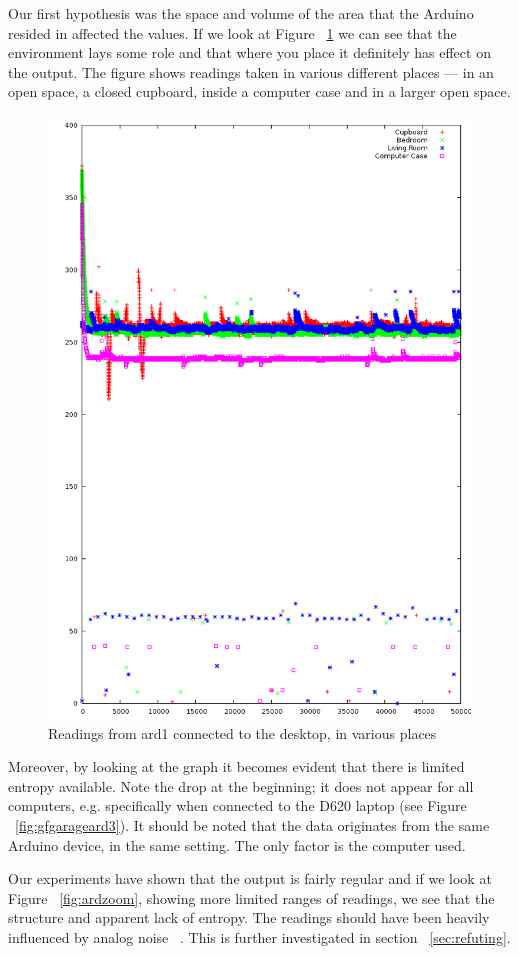 \documentclass[a4paper]{article}           %
\begin{document}
Our first hypothesis was the space and volume of the area that the Arduino resided in affected the values. If we look at Figure ~\ref{fig:ard3space} we can see that the environment lays some role and that where you place it definitely has effect on the output. The figure shows readings taken in various different places --- in an open space, a closed cupboard, inside a computer case and in a larger open space. 

\begin{figure}[H]
  \centering  
  \includegraphics[width=0.7\columnwidth]{img/RoomTempOverlay.png}
  
  \caption{Readings from ard1 connected to the desktop, in various places}
  \label{fig:ard3space}
\end{figure}

Moreover, by looking at the graph it becomes evident that there is limited entropy available. Note the drop at the beginning; it does not appear for all computers, e.g. specifically when connected to the D620 laptop (see Figure ~\ref{fig:gfgarageard3}). It should be noted that the data originates from the same Arduino device, in the same setting. The only factor is the computer used. 



Our experiments have shown that the output is fairly regular and if we look at Figure ~\ref{fig:ardzoom}, showing more limited ranges of readings, we see that the structure and apparent lack of entropy. The readings should have been heavily influenced by analog noise ~\cite{ardref}. This is further investigated in section ~\ref{sec:refuting}. 
\end{document}
